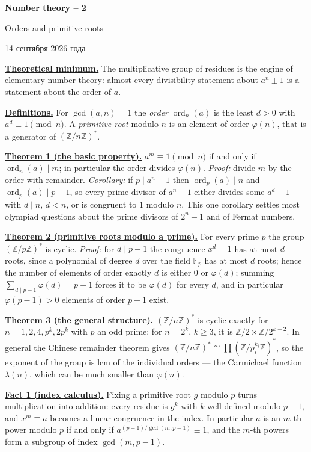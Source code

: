 \documentclass[11pt,a4paper]{article}
\newcommand{\head}[1]{\par\bigskip\noindent\textbf{\underline{#1}}\quad}
\newcommand{\rudate}{14 сентября 2026 года}
\newcommand{\sheettitle}[3]{%
  \begin{center}
  {\huge\bfseries #1\par}\vspace{1.2em}
  {\Large #2\par}\vspace{0.8em}
  \if\relax\detokenize{#3}\relax\else{\Large #3\par}\vspace{0.8em}\fi
  {\foreignlanguage{russian}{\rudate}\par}
  \end{center}\vspace{0.5em}}
\DeclareMathOperator{\ord}{ord}
\begin{document}
\sheettitle{Number theory -- 2}{Orders and primitive roots}{}

\head{Theoretical minimum.} The multiplicative group of residues is the engine of elementary
number theory: almost every divisibility statement about $a^n\pm1$ is a statement about the order
of $a$.

\head{Definitions.} For $\gcd(a,n)=1$ the \emph{order} $\ord_n(a)$ is the least $d>0$ with
$a^d\equiv1\pmod n$. A \emph{primitive root} modulo $n$ is an element of order $\varphi(n)$, that is
a generator of $(\mathbb Z/n\mathbb Z)^*$.

\head{Theorem 1 (the basic property).} $a^m\equiv1\pmod n$ if and only if $\ord_n(a)\mid m$; in
particular the order divides $\varphi(n)$. \emph{Proof:} divide $m$ by the order with remainder.
\emph{Corollary:} if $p\mid a^n-1$ then $\ord_p(a)\mid n$ and $\ord_p(a)\mid p-1$, so every prime
divisor of $a^n-1$ either divides some $a^d-1$ with $d\mid n$, $d<n$, or is congruent to $1$ modulo
$n$. This one corollary settles most olympiad questions about the prime divisors of $2^n-1$ and of
Fermat numbers.

\head{Theorem 2 (primitive roots modulo a prime).} For every prime $p$ the group
$(\mathbb Z/p\mathbb Z)^*$ is cyclic. \emph{Proof:} for $d\mid p-1$ the congruence $x^d=1$ has at
most $d$ roots, since a polynomial of degree $d$ over the field $\mathbb F_p$ has at most $d$ roots;
hence the number of elements of order exactly $d$ is either $0$ or $\varphi(d)$; summing
$\sum_{d\mid p-1}\varphi(d)=p-1$ forces it to be $\varphi(d)$ for every $d$, and in particular
$\varphi(p-1)>0$ elements of order $p-1$ exist.

\head{Theorem 3 (the general structure).} $(\mathbb Z/n\mathbb Z)^*$ is cyclic exactly for
$n=1,2,4,p^k,2p^k$ with $p$ an odd prime; for $n=2^k$, $k\geqslant3$, it is
$\mathbb Z/2\times\mathbb Z/2^{k-2}$. In general the Chinese remainder theorem gives
$(\mathbb Z/n\mathbb Z)^*\cong\prod(\mathbb Z/p_i^{k_i}\mathbb Z)^*$, so the exponent of the group
is lcm of the individual orders --- the Carmichael function $\lambda(n)$, which can be much smaller
than $\varphi(n)$.

\head{Fact 1 (index calculus).} Fixing a primitive root $g$ modulo $p$ turns multiplication into
addition: every residue is $g^k$ with $k$ well defined modulo $p-1$, and $x^m\equiv a$ becomes a
linear congruence in the index. In particular $a$ is an $m$-th power modulo $p$ if and only if
$a^{(p-1)/\gcd(m,p-1)}\equiv1$, and the $m$-th powers form a subgroup of index $\gcd(m,p-1)$.
\end{document}
